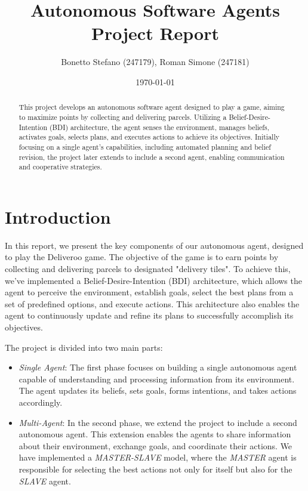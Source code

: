\documentclass[10pt]{article}
\title{\textbf{Autonomous Software Agents Project Report}}
\author{Bonetto Stefano (247179), Roman Simone (247181)}
\date{\today}
\begin{document}
\maketitle

\begin{abstract}
    This project develops an autonomous software agent designed to play a game, aiming to maximize points by collecting and delivering parcels. Utilizing a Belief-Desire-Intention (BDI) architecture, the agent senses the environment, manages beliefs, activates goals, selects plans, and executes actions to achieve its objectives. Initially focusing on a single agent's capabilities, including automated planning and belief revision, the project later extends to include a second agent, enabling communication and cooperative strategies.
\end{abstract}

\section{Introduction}
In this report, we present the key components of our autonomous agent, designed to play the Deliveroo game. The objective of the game is to earn points by collecting and delivering parcels to designated "delivery tiles". To achieve this, we've implemented a Belief-Desire-Intention (BDI) architecture, which allows the agent to perceive the environment, establish goals, select the best plans from a set of predefined options, and execute actions. This architecture also enables the agent to continuously update and refine its plans to successfully accomplish its objectives.

The project is divided into two main parts:
\begin{itemize}
    \item \textit{Single Agent}: The first phase focuses on building a single autonomous agent capable of understanding and processing information from its environment. The agent updates its beliefs, sets goals, forms intentions, and takes actions accordingly. 
    \item \textit{Multi-Agent}: In the second phase, we extend the project to include a second autonomous agent. This extension enables the agents to share information about their environment, exchange goals, and coordinate their actions. We have implemented a \textit{MASTER-SLAVE} model, where the \textit{MASTER} agent is responsible for selecting the best actions not only for itself but also for the \textit{SLAVE} agent.
\end{itemize}
\end{document}
